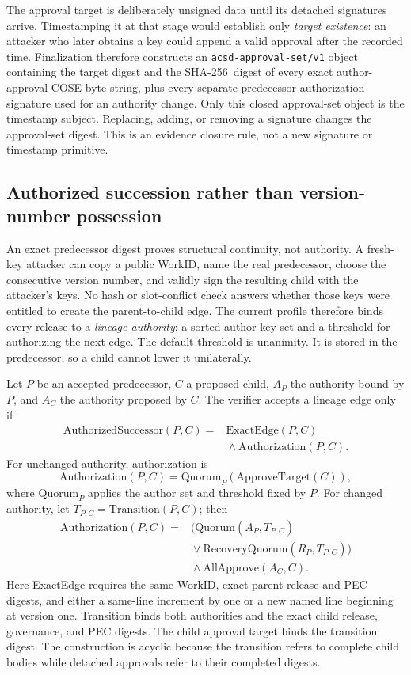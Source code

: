 \documentclass[conference,compsoc]{IEEEtran}
\newcommand{\sha}{\textsf{SHA-256}}
\begin{document}
The approval target is deliberately unsigned data until its detached
signatures arrive. Timestamping it at that stage would establish only
\emph{target existence}: an attacker who later obtains a key could append a
valid approval after the recorded time. Finalization therefore constructs an
\texttt{acsd-approval-set/v1} object containing the target digest and the
\sha\ digest of every exact author-approval COSE byte string, plus every
separate predecessor-authorization signature used for an authority change.
Only this closed approval-set object is the timestamp subject. Replacing, adding, or
removing a signature changes the approval-set digest. This is an evidence
closure rule, not a new signature or timestamp primitive.

\subsection{Authorized succession rather than version-number possession}

An exact predecessor digest proves structural continuity, not authority. A
fresh-key attacker can copy a public WorkID, name the real predecessor, choose
the consecutive version number, and validly sign the resulting child with the
attacker's keys. No hash or slot-conflict check answers whether those keys were
entitled to create the parent-to-child edge. The current profile therefore binds every
release to a \emph{lineage authority}: a sorted author-key set and a threshold
for authorizing the next edge. The default threshold is unanimity. It is stored
in the predecessor, so a child cannot lower it unilaterally.

Let $P$ be an accepted predecessor, $C$ a proposed child, $A_P$ the authority
bound by $P$, and $A_C$ the authority proposed by $C$. The verifier accepts a
lineage edge only if
\[
\begin{aligned}
 \mathrm{AuthorizedSuccessor}(P,C) ={}& \mathrm{ExactEdge}(P,C)\\
 &{}\land \mathrm{Authorization}(P,C).
\end{aligned}
\]
For unchanged authority, authorization is
\[
 \mathrm{Authorization}(P,C)=
 \mathrm{Quorum}_{P}(\mathrm{ApproveTarget}(C)),
\]
where $\mathrm{Quorum}_{P}$ applies the author set and threshold fixed by $P$.
For changed authority, let $T_{P,C}=\mathrm{Transition}(P,C)$; then
\[
\begin{aligned}
 \mathrm{Authorization}(P,C) ={}&
   \bigl(\mathrm{Quorum}(A_P,T_{P,C})\\
 &{}\lor \mathrm{RecoveryQuorum}(R_P,T_{P,C})\bigr)\\
 &{}\land \mathrm{AllApprove}(A_C,C).
\end{aligned}
\]
Here \textsf{ExactEdge} requires the same WorkID, exact parent release and PEC
digests, and either a same-line increment by one or a new named line beginning
at version one. \textsf{Transition} binds both authorities and the exact child
release, governance, and PEC digests. The child approval target binds the
transition digest. The construction is acyclic because the transition refers
to complete child bodies while detached approvals refer to their completed
digests.
\end{document}
